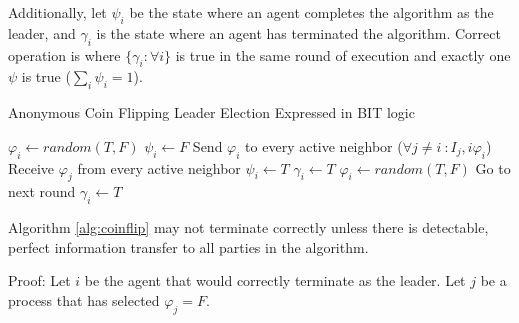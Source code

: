 Additionally, let $\psi_i$ be the state where an agent completes the algorithm as the leader, and $\gamma_i$ is the state where an agent has terminated the algorithm.
Correct operation is where $\{\gamma_i : \forall i \}$ is true in the same round of execution and exactly one $\psi$ is true ($\sum_i \psi_i = 1$).

\begin{algorithm}
\caption{Anonymous Coin Flipping Leader Election Expressed in BIT logic}
\label{alg:coinflip}
\begin{algorithmic}[1]
\small
\State $\varphi_i \gets random(T,F)$
\State $\psi_i \gets F$
\State Send $\varphi_i$ to every active neighbor ($\forall j \neq i\ : I_j,i \varphi_i$)
\State Receive $\varphi_j$ from every active neighbor 
	\State $\psi_i \gets T$
	\State $\gamma_i \gets T$
	\State $\varphi_i \gets random(T,F)$
	\State Go to next round
	\State $\gamma_i \gets T$
\EndIf
\end{algorithmic}
\end{algorithm}

\begin{thm}
Algorithm \ref{alg:coinflip} may not terminate correctly unless there is detectable, perfect information transfer to all parties in the algorithm.
\end{thm}

Proof: Let $i$ be the agent that would correctly terminate as the leader. Let $j$ be a process that has selected $\varphi_j = F$.

